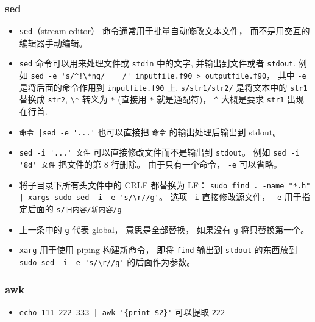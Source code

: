 \subsubsection{sed}
\begin{itemize}
\item \verb`sed`（stream editor） 命令通常用于批量自动修改文本文件， 而不是用交互的编辑器手动编辑。
\item \verb`sed` 命令可以用来处理文件或 \verb`stdin` 中的文字, 并输出到文件或者 \verb`stdout`. 例如
\verb`sed -e 's/^!\*nq/    /' inputfile.f90 > outputfile.f90`， 其中 \verb`-e` 是将后面的命令作用到 \verb`inputfile.f90` 上. \verb`s/str1/str2/` 是将文本中的 \verb`str1` 替换成 \verb`str2`, \verb`\*` 转义为 \verb`*` (直接用 \verb`*` 就是通配符)， \verb`^` 大概是要求 \verb`str1` 出现在行首.
\item \verb`命令 |sed -e '...'` 也可以直接把 \verb`命令` 的输出处理后输出到 stdout。
\item \verb`sed -i '...' 文件` 可以直接修改文件而不是输出到 \verb`stdout`。 例如 \verb`sed -i '8d' 文件` 把文件的第 8 行删除。 由于只有一个命令， \verb`-e` 可以省略。
\item 将子目录下所有头文件中的 CRLF 都替换为 LF： \verb`sudo find . -name "*.h" | xargs sudo sed -i -e 's/\r//g'`。 选项 \verb`-i` 直接修改源文件， \verb`-e` 用于指定后面的 \verb`s/旧内容/新内容/g`
\item 上一条中的 \verb`g` 代表 global， 意思是全部替换， 如果没有 \verb`g` 将只替换第一个。
\item \verb`xarg` 用于使用 piping 构建新命令， 即将 \verb`find` 输出到 \verb`stdout` 的东西放到 \verb`sudo sed -i -e 's/\r//g'` 的后面作为参数。
\end{itemize}

\subsubsection{awk}
\begin{itemize}
\item \verb`echo 111 222 333 | awk '{print $2}'` 可以提取 \verb`222`
\end{itemize}

